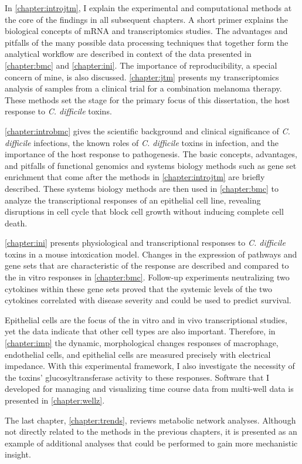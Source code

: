 In \autoref{chapter:introjtm}, I explain the experimental and computational
methods at the core of the findings in all subsequent chapters.
A short primer explains the biological concepts of mRNA and transcriptomics
studies. The advantages and pitfalls of the many possible data processing
techniques that together form the analytical workflow are described in context
of the data presented in \autoref{chapter:bmc} and \autoref{chapter:ini}. 
The importance of reproducibility, a special concern of mine, is also 
discussed. \autoref{chapter:jtm} presents my transcriptomics analysis of
samples from a clinical trial for a combination melanoma therapy.
These methods set the stage for the primary focus of this dissertation,
the host response to \textit{C. difficile} toxins.

\autoref{chapter:introbmc} gives the scientific background
and clinical significance of \textit{C. difficile} infections, 
the known roles of \textit{C. difficile} toxins in infection,
and the importance of the host response to pathogenesis.
The basic concepts, advantages, and pitfalls of functional genomics 
and systems biology methods such as
gene set enrichment that come after the methods in \autoref{chapter:introjtm}
are briefly described. These systems biology methods are then used in \autoref{chapter:bmc}
to analyze the transcriptional responses of an epithelial cell line, revealing
disruptions in cell cycle that block cell growth without inducing
complete cell death.

\autoref{chapter:ini} presents physiological 
and transcriptional responses to \textit{C. difficile} toxins
in a mouse intoxication model. Changes in the expression of pathways and gene sets that
are characteristic of the response are described and compared to
the in vitro responses in \autoref{chapter:bmc}.
Follow-up experiments neutralizing two cytokines within
these gene sets proved that the systemic levels of the two cytokines
correlated with disease severity and could be used to
predict survival.

Epithelial cells are the focus of the in vitro and in vivo
transcriptional studies, yet the data indicate that other cell types
are also important. Therefore, in \autoref{chapter:imp}
the dynamic, morphological changes responses of macrophage, endothelial cells, 
and epithelial
cells are measured precisely with electrical impedance.
With this experimental framework, I also investigate the necessity
of the toxins' glucosyltransferase activity to these responses.
Software that I developed for managing and visualizing time course data from
multi-well data is presented in \autoref{chapter:wellz}.

The last chapter, \autoref{chapter:trends}, reviews
metabolic network analyses. Although not directly related to
the methods in the previous chapters, it is presented as an
example of additional analyses that could be performed
to gain more mechanistic insight.



